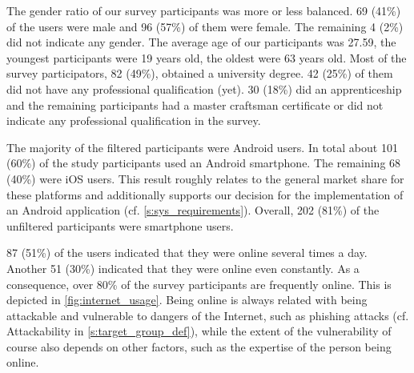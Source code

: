 \begin{description}[leftmargin=0cm]
	\item[General Information:] The gender ratio of our survey participants was more or less balanced.
 69 (41\%) of the users were male and 96 (57\%) of them were female.
 The remaining 4 (2\%) did not indicate any gender.
 The average age of our participants was 27.59, the youngest participants were 19 years old, the oldest were 63 years old.
 Most of the survey participators, 82 (49\%), obtained a university degree.
 42 (25\%) of them did not have any professional qualification (yet). 30 (18\%) did an apprenticeship and the remaining participants had a master craftsman certificate or did not indicate any professional qualification in the survey.
	
	\item[High Rate of Android Users:] The majority of the filtered participants were Android users.
 In total about 101 (60\%) of the study participants used an Android smartphone.
 The remaining 68 (40\%) were iOS users.
 This result roughly relates to the general market share for these platforms and additionally supports our decision for the implementation of an Android application (cf. \autoref{s:sys_requirements}). Overall, 202 (81\%) of the unfiltered participants were smartphone users.

	\item[High Internet Usage Frequency:] 87 (51\%) of the users indicated that they were online several times a day.
 Another 51 (30\%) indicated that they were online even constantly.
 As a consequence, over 80\% of the survey participants are frequently online.
 This is depicted in \autoref{fig:internet_usage}. Being online is always related with being attackable and vulnerable to dangers of the Internet, such as phishing attacks (cf. Attackability in \autoref{s:target_group_def}), while the extent of the vulnerability of course also depends on other factors, such as the expertise of the person being online.
	

\end{description}
